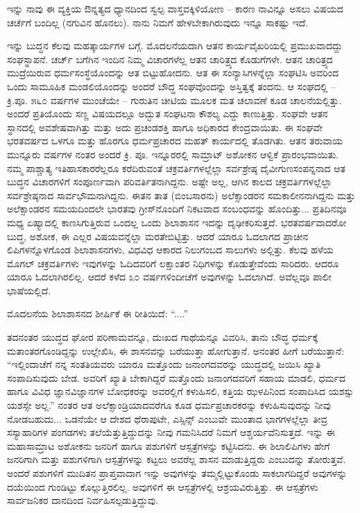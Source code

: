 ಇನ್ನು ನಾವು ಈ ವ್ಯಕ್ತಿಯ ಔನ್ನತ್ಯದ ಧ್ಯಾನದಿಂದ ಸ್ವಲ್ಪ ವಾಸ್ತವಕ್ಕಿಳಿಯೋಣ – ಕಾರಣ ನಾವಿನ್ನೂ ಅಸಲು ವಿಷಯದ ಚರ್ಚೆಗೆ ಬಂದಿಲ್ಲ (ನಗುವಿನ ಹೊನಲು). ನಾನು ನಿಮಗೆ ಹೇಳಬೇಕಾಗಿರುವುದು ಇನ್ನೂ ಸಾಕಷ್ಟು ಇದೆ.

ಇನ್ನು ಬುದ್ಧನ ಕೆಲವು ಮಹತ್ಕಾರ್ಯಗಳ ಬಗ್ಗೆ. ಮೊದಲನೆಯದಾಗಿ ಆತನ ಕಾರ್ಯವೈಖರಿಯಲ್ಲಿ ಪ್ರಮುಖವಾದದ್ದು ಸಂಘಸ್ಥಾಪನೆ. ಚರ್ಚ್ ಬಗೆಗಿನ ಇಂದಿನ ನಿಮ್ಮ ವಿಚಾರಗಳೆಲ್ಲ ಆತನ ಚಾರಿತ್ರ್ಯದ ಕೊಡುಗೆಗಳೇ. ಆತನ ಚಾರಿತ್ರ್ಯದ ಮುದ್ರೆಯಿರುವ ಧರ್ಮಸಂಸ್ಥೆಯೊಂದನ್ನು ಆತ ಬಿಟ್ಟುಹೋದನು. ಆತ ಈ ಸಂನ್ಯಾಸಿಗಳನ್ನೆಲ್ಲಾ ಸಂಘಟಿಸಿ ಅವರಿಂದ ಒಂದು ಸಾಮೂಹಿಕ ಮಂಡಲಿಯೊಂದನ್ನು ಅಂದರೆ ಬೌದ್ಧ ಸಂಘವೊಂದನ್ನು ಅಸ್ತಿತ್ವಕ್ಕೆ ತಂದನು. ಆ ಸಂಘದಲ್ಲಿ – ಕ್ರಿ.ಪೂ. ೫೬೦ ವರ್ಷಗಳ ಮುಂಚೆಯೇ – ಗುರುತಿನ ಚೀಟಿಯ ಮೂಲಕ ಮತ ಚಲಾವಣೆ ಕೂಡ ಚಾಲನೆಯಲ್ಲಿತ್ತು. ಅಂದರೆ ಪ್ರತಿಯೊಂದು ಸಣ್ಣ ವಿಷಯದಲ್ಲೂ ಅದ್ಭುತ ಸಂಘಟನಾ ಕೌಶಲ್ಯ ಎದ್ದು ಕಾಣುತ್ತಿತ್ತು. ಸಂಘವೇ ಆತನ ಸ್ಥಾನದಲ್ಲಿ ಅವಶೇಷವಾಗಿತ್ತು ಮತ್ತು ಅದು ಪ್ರಚಂಡಶಕ್ತಿ ಹಾಗೂ ಅಧಿಕಾರದ ಕೇಂದ್ರವಾಯಿತು. ಈ ಸಂಘವೇ ಭರತವರ್ಷದ ಒಳಗೂ ಮತ್ತು ಹೊರಗೂ ಧರ್ಮಪ್ರಚಾರದ ಮಹತ್ ಕಾರ್ಯದಲ್ಲಿ ತೊಡಗಿತು. ಆತನ ತರುವಾಯ ಮುನ್ನೂರು ವರ್ಷಗಳ ನಂತರ ಅಂದರೆ ಕ್ರಿ. ಪೂ. ಇನ್ನೂರರಲ್ಲಿ ಸಾಮ್ರಾಟ್ ಅಶೋಕನ ಆಳ್ವಿಕೆ ಪ್ರಾರಂಭವಾಯಿತು. ನಮ್ಮ ಪಾಶ್ಚಾತ್ಯ ಇತಿಹಾಸಕಾರರೆಲ್ಲರೂ ಕರೆದಿರುವಂತೆ ಚಕ್ರವರ್ತಿಗಳಲ್ಲೆಲ್ಲಾ ಸರ್ವಶ್ರೇಷ್ಠ ದೈವೀಗುಣಸಂಪನ್ನನಾದ ಆತ ಬುದ್ಧನ ವಿಚಾರಗಳಿಗೆ ಸಂಪೂರ್ಣವಾಗಿ ಪರಿವರ್ತಿತನಾಗಿದ್ದನು. ಅಷ್ಟೇ ಅಲ್ಲ, ಆಗಿನ ಕಾಲದ ಚಕ್ರವರ್ತಿಗಳಲ್ಲೆಲ್ಲಾ ಸರ್ವಶ್ರೇಷ್ಠನಾದ ಸಾರ್ವಭೌಮನಾಗಿದ್ದನು. ಈತನ ತಾತ (ಬಿಂಬಸಾರನು) ಅಲೆಕ್ಸಾಂಡರನ ಸಮಕಾಲೀನನಾಗಿದ್ದನು ಮತ್ತು ಅಲೆಕ್ಸಾಂಡರನ ಸಮಯದಿಂದಲೇ ಭಾರತವು ಗ್ರೀಸ್‌ನೊಂದಿಗೆ ನಿಕಟವಾದ ಸಂಬಂಧವನ್ನು ಹೊಂದಿತ್ತು... ಪ್ರತಿದಿನವೂ ಮಧ್ಯ ಏಷ್ಯಾದಲ್ಲಿ ಕಾಣಸಿಗುತ್ತಿರುವ ಒಂದಲ್ಲ ಒಂದು ಶಿಲಾಶಾಸನ ಇದನ್ನು ದೃಢೀಕರಿಸುತ್ತದೆ. ಭರತವರ್ಷವಾದರೋ ಬುದ್ಧ, ಅಶೋಕ, ಈ ಎಲ್ಲರ ವಿಷಯವನ್ನೆಲ್ಲಾ ಮರತೇಬಿಟ್ಟಿತ್ತು. ಆದರೆ ಯಾರೂ ಓದಲಾಗದ ಪ್ರಾಚೀನ ಲಿಪಿಗಳನ್ನೊಳಗೊಂಡ ಶಿಲಾಶಾಸನಗಳು, ವಿಧವಿಧ ಆಕಾರದ ನಿಲುಗಂಬದ ಸಾಲುಗಳು ಅಲ್ಲಿತ್ತು. ಕೆಲವು ಹಳೆಯ ಮೊಗಲ್ ಚಕ್ರವರ್ತಿಗಳು ಇವುಗಳನ್ನು ಓದಿದವರಿಗೆ ಲಕ್ಷಾಂತರ ನಿಧಿಗಳನ್ನು ಕೊಡುತ್ತೇವೆಂದು ಸಾರಿದರು. ಆದರೂ ಯಾರೂ ಓದಲಾಗಿರಲಿಲ್ಲ. ಆದರೆ ಕಳೆದ ೩೦ ವರ್ಷಗಳಿಂದೀಚೆಗೆ ಅವುಗಳನ್ನು ಓದಲಾಗಿದೆ. ಅವೆಲ್ಲವೂ ಪಾಲೀ ಭಾಷೆಯಲ್ಲಿದೆ.

ಮೊದಲನೆಯ ಶಿಲಾಶಾಸನದ ಶೀರ್ಷಿಕೆ ಈ ರೀತಿಯಿದೆ: “....”

ತದನಂತರ ಯುದ್ಧದ ಘೋರ ಪರಿಣಾಮವನ್ನೂ, ದುಃಖದ ಗಾಥೆಯನ್ನೂ ವಿವರಿಸಿ, ತಾನು ಬೌದ್ಧ ಧರ್ಮಕ್ಕೆ ಮತಾಂತರಗೊಂಡಿದ್ದನ್ನು ಉಲ್ಲೇಖಿಸಿ, ಈ ಶಾಸನವನ್ನು ಬರೆಯುತ್ತಾ ಹೋಗುತ್ತಾನೆ. ಅನಂತರ ಹೀಗೆ ಬರೆಯುತ್ತಾನೆ: “ಇಲ್ಲಿಂದಾಚೆಗೆ ನನ್ನ ಸಂತತಿಯವರು ಯಾರೂ ಮತ್ತೊಂದು ಜನಾಂಗದವರನ್ನು ಯುದ್ಧದಲ್ಲಿ ಜಯಿಸಿ ಖ್ಯಾತಿ ಸಂಪಾದಿಸುವುದು ಬೇಡ. ಅವರಿಗೆ ಖ್ಯಾತಿ ಬೇಕಾಗಿದ್ದರೆ ಮತ್ತೊಂದು ಜನಾಂಗದವರಿಗೆ ಸಹಾಯ ಮಾಡಲಿ, ಧರ್ಮದ ಹಾಗೂ ವಿವಿಧ ಜ್ಞಾನವಿಜ್ಞಾನಗಳ ಬೋಧಕರನ್ನು ಅವರಲ್ಲಿಗೆ ಕಳುಹಿಸಲಿ, ಕತ್ತಿಯ ಝಳಪಿನಿಂದ ಸಂಪಾದಿಸಿದ ಯಶಸ್ಸು ಯಶಸ್ಸೇ ಅಲ್ಲ.” ನಂತರ ಆತ ಅಲೆಕ್ಸಾಂಡ್ರಿಯಾದವರೆಗೂ ಕೂಡ ಧರ್ಮಪ್ರಚಾರಕರನ್ನು ಕಳುಹಿಸುವುದನ್ನು ನೀವು ನೋಡಬಹುದು... ಒಡನೆಯೇ ಆ ದೇಶದ ಥೆರಾಪುಟೇ, ಎಸ್ಸಿನ್ಸ್ ಎಂಬುವೇ ಮುಂತಾದ ಭಾಗಗಳಲ್ಲೆಲ್ಲಾ ತೀವ್ರ ಸಸ್ಯಾಹಾರಿಗಳ ಪಂಗಡಗಳು ತಲೆಯೆತ್ತುತ್ತಿದ್ದುದನ್ನು ನೀವು ಗಮನಿಸಿದರೆ ನಿಮಗೆ ಆಶ್ಚರ್ಯವೆನಿಸುತ್ತದೆ. ಇನ್ನು ಈ ಮಹಾಸಾಮ್ರಾಟ ಅಶೋಕನು ಜನರಿಗೆ ಹಾಗೂ ಪಶುಗಳಿಗೆ ಆಸ್ಪತ್ರೆಗಳನ್ನು ಕಟ್ಟಿಸಿದನು. ಈ ಶಿಲಾಲಿಪಿಗಳು ಹೇಗೆ ಜನರಿಗಾಗಿ ಮತ್ತು ಪಶುಗಳಿಗಾಗಿ ಆಸ್ಪತ್ರೆಗಳನ್ನು ಕಟ್ಟಲು ಅವರೆಲ್ಲ ಶಾಸನ ಮಾಡುತ್ತಿದ್ದರು ಎಂಬುದನ್ನು ತೋರುತ್ತವೆ. ಅಂದರೆ ಪಶುಗಳಿಗೆ ಮುದಿತನ ಪ್ರಾಪ್ತವಾದಾಗ ಇನ್ನು ಅವುಗಳನ್ನು ತಮ್ಮಲ್ಲಿಟ್ಟುಕೊಂಡು ಸಾಕಲಾಗದಿದ್ದರೆ ಅವುಗಳನ್ನು ದಯೆಯಿಂದ ಗುಂಡಿಟ್ಟು ಕೊಲ್ಲುತ್ತಿರಲಿಲ್ಲ. ಅವುಗಳಿಗೆ ಈ ಆಸ್ಪತ್ರೆಗಳಲ್ಲಿ ಆಶ್ರಯವಿರುತ್ತಿತ್ತು. ಈ ಆಸ್ಪತ್ರೆಗಳು ಸಾರ್ವಜನಿಕರ ದಾನದಿಂದ ನಿರ್ವಹಿಸಲ್ಪಡುತ್ತಿದ್ದುವು.

